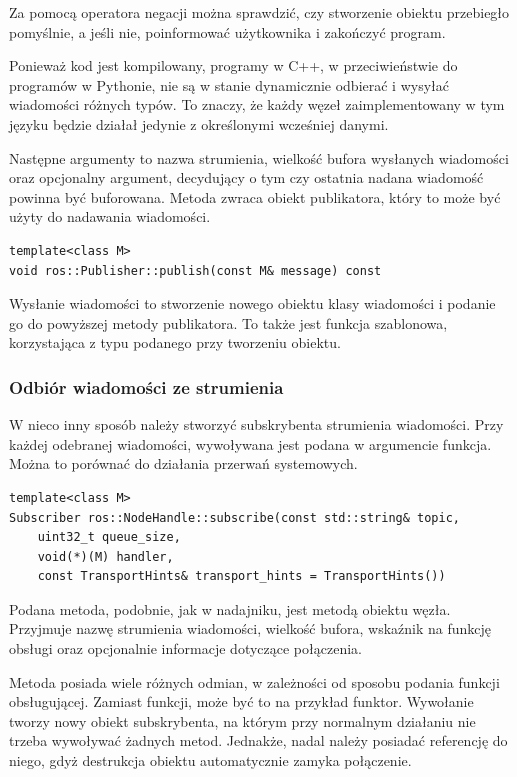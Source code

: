 			Za pomocą operatora negacji można sprawdzić, czy stworzenie obiektu przebiegło pomyślnie, a jeśli nie, poinformować użytkownika i zakończyć program.
			
			Ponieważ kod jest kompilowany, programy w C++, w przeciwieństwie do programów w Pythonie, nie są w stanie dynamicznie odbierać i wysyłać wiadomości różnych typów.
			To znaczy, że każdy węzeł zaimplementowany w tym języku będzie działał jedynie z określonymi wcześniej danymi.
			
			Następne argumenty to nazwa strumienia, wielkość bufora wysłanych wiadomości oraz opcjonalny argument, decydujący o tym czy ostatnia nadana wiadomość powinna
			być buforowana. Metoda zwraca obiekt publikatora, który to może być użyty do nadawania wiadomości.
			\begin{verbatim}
template<class M>
void ros::Publisher::publish(const M& message) const
			\end{verbatim}		
			
			Wysłanie wiadomości to stworzenie nowego obiektu klasy wiadomości i podanie go do powyższej metody publikatora.
			To także jest funkcja szablonowa, korzystająca z typu podanego przy tworzeniu obiektu.
			
		\subsubsection{Odbiór wiadomości ze strumienia}
			W nieco inny sposób należy stworzyć subskrybenta strumienia wiadomości.
			Przy każdej odebranej wiadomości, wywoływana jest podana w argumencie funkcja.
			Można to porównać do działania przerwań systemowych.
			\begin{verbatim}
template<class M>
Subscriber ros::NodeHandle::subscribe(const std::string& topic,
	uint32_t queue_size,
	void(*)(M) handler,
	const TransportHints& transport_hints = TransportHints())
			\end{verbatim}
			Podana metoda, podobnie, jak w nadajniku, jest metodą obiektu węzła.
			Przyjmuje nazwę strumienia wiadomości, wielkość bufora, wskaźnik na funkcję obsługi oraz opcjonalnie informacje dotyczące połączenia.
			
			Metoda posiada wiele różnych odmian, w zależności od sposobu podania funkcji obsługującej. Zamiast funkcji, może być to na przykład funktor.
			Wywołanie tworzy nowy obiekt subskrybenta, na którym przy normalnym działaniu nie trzeba wywoływać żadnych metod.
			Jednakże, nadal należy posiadać referencję do niego, gdyż destrukcja obiektu automatycznie zamyka połączenie.
			
